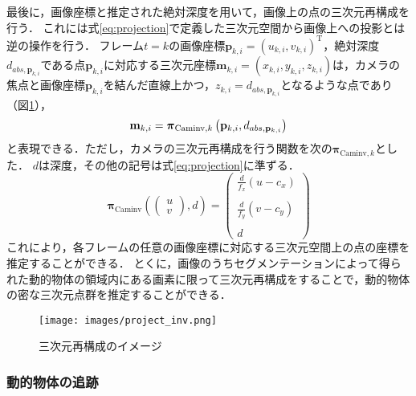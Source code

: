 最後に，画像座標と推定された絶対深度を用いて，画像上の点の三次元再構成を行う．
これには式\ref{eq:projection}で定義した三次元空間から画像上への投影とは逆の操作を行う．
フレーム$t=k$の画像座標$\mathbf{p}_{k,i}={(u_{k,i}, v_{k,i})}^\mathrm{T}$，絶対深度${d}_{abs,\mathbf{p}_{k,i}}$である点$\mathbf{p}_{k,i}$に対応する三次元座標$\mathbf{m}_{k,i}=(x_{k,i},y_{k,i},z_{k,i})$は，カメラの焦点と画像座標$\mathbf{p}_{k,i}$を結んだ直線上かつ，$z_{k,i}={d}_{abs,\mathbf{p}_{k,i}}$となるような点であり（図\ref{fig:project_inv}），
\begin{equation}\label{eq:projection_inv}
		\\\mathbf{m}_{k,i}
		=
		\boldsymbol{\pi}_{\text{Caminv},k}
		\left(\mathbf{p}_{k,i},{d}_{abs,\mathbf{p}_{k,i}}
		\right)
\end{equation}
と表現できる．ただし，カメラの三次元再構成を行う関数を次の$\boldsymbol{\pi}_{\text{Caminv},k}$とした．
$d$は深度，その他の記号は式\ref{eq:projection}に準ずる．
\begin{equation}\label{eq:inv_projection}
	\boldsymbol{\pi}_{\text{Caminv}}
	\left(
	\left(
	\begin{array}{c}
		u\\v
	\end{array}
	\right)
	,d
	\right)
	=
	\left(
	\begin{array}{c}
		\frac{d}{f_x}(u-c_{x})  \\\\  \frac{d}{f_y}(v-c_{y})  \\\\ d 
	\end{array}
	\right)
\end{equation}
これにより，各フレームの任意の画像座標に対応する三次元空間上の点の座標を推定することができる．
とくに，画像のうちセグメンテーションによって得られた動的物体の領域内にある画素に限って三次元再構成をすることで，動的物体の密な三次元点群を推定することができる．

\begin{figure}[h]
	\centering
	\texttt{[image: images/project\_inv.png]}
	\caption{三次元再構成のイメージ}
	\label{fig:project_inv}
\end{figure}

\subsubsection*{動的物体の追跡}

